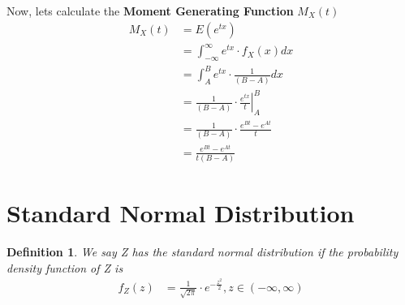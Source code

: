 \documentclass[11pt,oneside]{book}
\theoremstyle{break}
\theoremstyle{break}
\newtheorem{defn}{Definition}[corL]
\begin{document}
Now, lets calculate the \textbf{Moment Generating Function} $M_X(t)$\begin{align*}
M_X(t)&=E(e^{tx})\\
&=\int_{-\infty}^{\infty}e^{tx}\cdot f_X(x)dx\\
&=\int_{A}^{B}e^{tx}\cdot \frac{1}{(B-A)}dx\\
&=\left. \frac{1}{(B-A)}\cdot \frac{e^{tx}}{t}\right|_{A}^{B}\\
&=\frac{1}{(B-A)}\cdot \frac{e^{Bt}-e^{At}}{t}\\
&=\frac{e^{Bt}-e^{At}}{t(B-A)}
\end{align*}
\section[Normal Distribution]{\color{DarkOrchid}Standard Normal Distribution\color{black}}
\begin{defn}
We say Z has the standard normal distribution if the probability density function of Z is\begin{align*}
f_Z(z)&=\frac{1}{\sqrt{2\pi}}\cdot e^{-\frac{z^2}{2}},z\in (-\infty,\infty)
\end{align*}
\end{defn}
\end{document}
